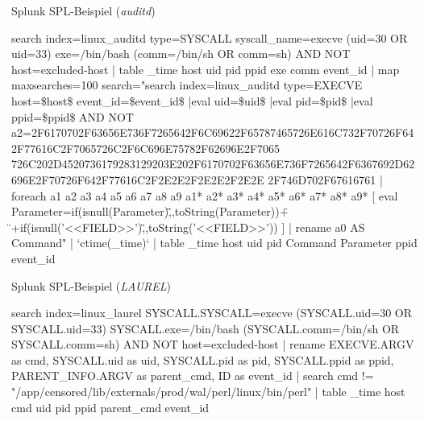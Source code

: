 \documentclass[xcolor={dvipsnames},aspectratio=169]{beamer}
\begin{document}
\begin{frame}[fragile] {Splunk SPL-Beispiel (\emph{auditd})}
\tiny
\begin{semiverbatim}
search index=linux\_auditd
  type=SYSCALL syscall\_name=execve
  (uid=30 OR uid=33)
  exe=/bin/bash (comm=/bin/sh OR comm=sh)
  AND NOT host=excluded-host
| table \_time host uid pid ppid exe comm event\_id 
| map maxsearches=100
  search="search index=linux\_auditd 
            type=EXECVE host=\$host\$ event\_id=\$event\_id\$ |eval uid=\$uid\$ |eval pid=\$pid\$ |eval ppid=\$ppid\$ 
            AND NOT a2=2F6170702F63656E736F7265642F6C69622F65787465726E616C732F70726F642F77616C2F7065726C2F6C696E75782F62696E2F7065
                       726C202D4520736179283129203E202F6170702F63656E736F7265642F6367692D62696E2F70726F642F77616C2F2E2E2F2E2E2F2E2E
                       2F746D702F67616761
    | foreach a1 a2 a3 a4 a5 a6 a7 a8 a9 a1* a2* a3* a4* a5* a6* a7* a8* a9* 
        [ eval Parameter=if(isnull(Parameter),\"{}\"{},toString(Parameter))+\"{} \"{}+if(isnull('<<FIELD>>'),\"{}\"{},toString('<<FIELD>>')) ]
    | rename a0 AS Command" 
| `ctime(\_time)` 
| table \_time host uid pid Command Parameter ppid event\_id 
\end{semiverbatim}
\end{frame}
\begin{frame}[fragile] {Splunk SPL-Beispiel (\emph{LAUREL})}
\small
\begin{semiverbatim}
search index=linux\_laurel
  SYSCALL.SYSCALL=execve 
  (SYSCALL.uid=30 OR SYSCALL.uid=33)
  SYSCALL.exe=/bin/bash (SYSCALL.comm=/bin/sh OR SYSCALL.comm=sh)
  AND NOT host=excluded-host
| rename EXECVE.ARGV as cmd, SYSCALL.uid as uid,
         SYSCALL.pid as pid, SYSCALL.ppid as ppid,
         PARENT\_INFO.ARGV as parent\_cmd, ID as event\_id
| search cmd != "{}/app/censored/lib/externals/prod/wal/perl/linux/bin/perl"{}
| table \_time host cmd uid pid ppid parent\_cmd event\_id 
\end{semiverbatim}
\end{frame}
\end{document}
